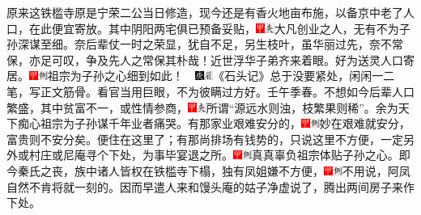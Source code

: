 原来这铁槛寺原是宁荣二公当日修造，现今还是有香火地亩布施，以备京中老了人口，在此便宜寄放。其中阴阳两宅俱已预备妥贴，{\includegraphics[width=3mm]{../Images/00002}\includegraphics[width=3mm]{../Images/00012}\footnotesize \kaishu 大凡创业之人，无有不为子孙深谋至细。奈后辈仗一时之荣显，犹自不足，另生枝叶，虽华丽过先，奈不常保，亦足可叹，争及先人之常保其朴哉！近世浮华子弟齐来着眼。}好为送灵人口寄居。{\includegraphics[width=3mm]{../Images/00002}\includegraphics[width=3mm]{../Images/00011}\footnotesize \kaishu 祖宗为子孙之心细到如此！　\includegraphics[width=3mm]{../Images/00004}\includegraphics[width=3mm]{../Images/00010}\footnotesize \kaishu 《石头记》总于没要紧处，闲闲一二笔，写正文筋骨。看官当用巨眼，不为彼瞒过方好。壬午季春。}不想如今后辈人口繁盛，其中贫富不一，或性情参商，{\includegraphics[width=3mm]{../Images/00002}\includegraphics[width=3mm]{../Images/00012}\footnotesize \kaishu 所谓``源远水则浊，枝繁果则稀''。余为天下痴心祖宗为子孙谋千年业者痛哭。}有那家业艰难安分的，{\includegraphics[width=3mm]{../Images/00002}\includegraphics[width=3mm]{../Images/00011}\footnotesize \kaishu 妙在艰难就安分，富贵则不安分矣。}便住在这里了；有那尚排场有钱势的，只说这里不方便，一定另外或村庄或尼庵寻个下处，为事毕宴退之所。{\includegraphics[width=3mm]{../Images/00002}\includegraphics[width=3mm]{../Images/00011}\footnotesize \kaishu 真真辜负祖宗体贴子孙之心。}即今秦氏之丧，族中诸人皆权在铁槛寺下榻，独有凤姐嫌不方便，{\includegraphics[width=3mm]{../Images/00002}\includegraphics[width=3mm]{../Images/00011}\footnotesize \kaishu 不用说，阿凤自然不肯将就一刻的。}因而早遣人来和馒头庵的姑子净虚说了，腾出两间房子来作下处。

